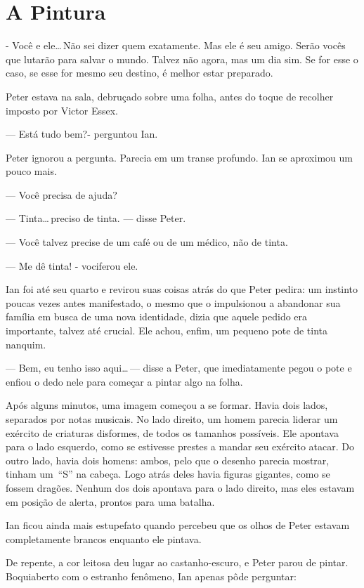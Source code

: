 \chapter{A Pintura}

- Você e ele\ldots\,Não sei dizer quem exatamente. Mas ele é seu amigo.
Serão vocês que lutarão para salvar o mundo. Talvez não agora, mas um
dia sim. Se for esse o caso, se esse for mesmo seu destino, é melhor
estar preparado.

Peter estava na sala, debruçado sobre uma folha, antes do toque de
recolher imposto por Victor Essex.

--- Está tudo bem?- perguntou Ian.

Peter ignorou a pergunta. Parecia em um transe profundo. Ian se
aproximou um pouco mais.

--- Você precisa de ajuda?

--- Tinta\ldots\,preciso de tinta. --- disse Peter.

--- Você talvez precise de um café ou de um médico, não de tinta.

--- Me dê tinta! - vociferou ele.

Ian foi até seu quarto e revirou suas coisas atrás do que Peter pedira:
um instinto poucas vezes antes manifestado, o mesmo que o impulsionou a
abandonar sua família em busca de uma nova identidade, dizia que aquele
pedido era importante, talvez até crucial. Ele achou, enfim, um pequeno
pote de tinta nanquim.

--- Bem, eu tenho isso aqui\ldots\,--- disse a Peter, que imediatamente
pegou o pote e enfiou o dedo nele para começar a pintar algo na folha.

Após alguns minutos, uma imagem começou a se formar. Havia dois lados,
separados por notas musicais. No lado direito, um homem parecia liderar
um exército de criaturas disformes, de todos os tamanhos possíveis. Ele
apontava para o lado esquerdo, como se estivesse prestes a mandar seu
exército atacar. Do outro lado, havia dois homens: ambos, pelo que o
desenho parecia mostrar, tinham um~“S” na cabeça. Logo atrás deles havia
figuras gigantes, como se fossem dragões. Nenhum dos dois apontava para
o lado direito, mas eles estavam em posição de alerta, prontos para uma
batalha.

Ian ficou ainda mais estupefato quando percebeu que os olhos de Peter
estavam completamente brancos enquanto ele pintava.

De repente, a cor leitosa deu lugar ao castanho-escuro, e Peter parou de
pintar. Boquiaberto com o estranho fenômeno, Ian apenas pôde perguntar:

